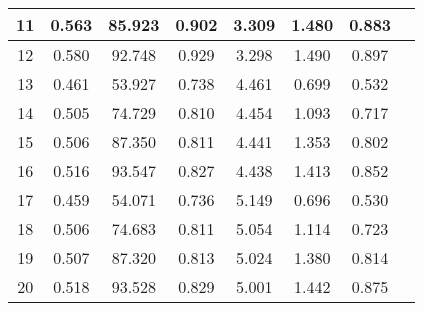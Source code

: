 \begin{table}[]
\begin{tabular}{|>{\columncolor[HTML]{EFEFEF}}c|c|>{\columncolor[HTML]{EFEFEF}}c|c|cccc|}
\cellcolor[HTML]{EFEFEF}11 & 0.563 & \cellcolor[HTML]{EFEFEF}85.923 & 0.902 & \cellcolor[HTML]{EFEFEF}3.309 & 1.480 & \cellcolor[HTML]{EFEFEF}0.883 \\ \hline
\cellcolor[HTML]{EFEFEF}12 & 0.580 & \cellcolor[HTML]{EFEFEF}92.748 & 0.929 & \cellcolor[HTML]{EFEFEF}3.298 & 1.490 & \cellcolor[HTML]{EFEFEF}0.897 \\ \hline
\cellcolor[HTML]{EFEFEF}13 & 0.461 & \cellcolor[HTML]{EFEFEF}53.927 & 0.738 & \cellcolor[HTML]{EFEFEF}4.461 & 0.699 & \cellcolor[HTML]{EFEFEF}0.532 \\ \hline
\cellcolor[HTML]{EFEFEF}14 & 0.505 & \cellcolor[HTML]{EFEFEF}74.729 & 0.810 & \cellcolor[HTML]{EFEFEF}4.454 & 1.093 & \cellcolor[HTML]{EFEFEF}0.717 \\ \hline
\cellcolor[HTML]{EFEFEF}15 & 0.506 & \cellcolor[HTML]{EFEFEF}87.350 & 0.811 & \cellcolor[HTML]{EFEFEF}4.441 & 1.353 & \cellcolor[HTML]{EFEFEF}0.802 \\ \hline
\cellcolor[HTML]{EFEFEF}16 & 0.516 & \cellcolor[HTML]{EFEFEF}93.547 & 0.827 & \cellcolor[HTML]{EFEFEF}4.438 & 1.413 & \cellcolor[HTML]{EFEFEF}0.852 \\ \hline
\cellcolor[HTML]{EFEFEF}17 & 0.459 & \cellcolor[HTML]{EFEFEF}54.071 & 0.736 & \cellcolor[HTML]{EFEFEF}5.149 & 0.696 & \cellcolor[HTML]{EFEFEF}0.530 \\ \hline
\cellcolor[HTML]{EFEFEF}18 & 0.506 & \cellcolor[HTML]{EFEFEF}74.683 & 0.811 & \cellcolor[HTML]{EFEFEF}5.054 & 1.114 & \cellcolor[HTML]{EFEFEF}0.723 \\ \hline
\cellcolor[HTML]{EFEFEF}19 & 0.507 & \cellcolor[HTML]{EFEFEF}87.320 & 0.813 & \cellcolor[HTML]{EFEFEF}5.024 & 1.380 & \cellcolor[HTML]{EFEFEF}0.814 \\ \hline
\cellcolor[HTML]{EFEFEF}20 & 0.518 & \cellcolor[HTML]{EFEFEF}93.528 & 0.829 & \cellcolor[HTML]{EFEFEF}5.001 & 1.442 & \cellcolor[HTML]{EFEFEF}0.875 \\ \hline
\end{tabular}
\end{table}


